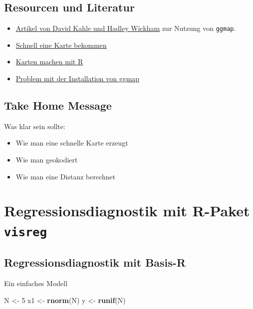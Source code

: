 \documentclass[]{article}
\newenvironment{Shaded}{\begin{snugshade}}{\end{snugshade}}
\newcommand{\KeywordTok}[1]{\textcolor[rgb]{0.13,0.29,0.53}{\textbf{{#1}}}}
\newcommand{\DecValTok}[1]{\textcolor[rgb]{0.00,0.00,0.81}{{#1}}}
\newcommand{\StringTok}[1]{\textcolor[rgb]{0.31,0.60,0.02}{{#1}}}
\newcommand{\NormalTok}[1]{{#1}}
\providecommand{\tightlist}{%
  \setlength{\itemsep}{0pt}\setlength{\parskip}{0pt}}
\begin{document}
\subsection{Resourcen und Literatur}\label{resourcen-und-literatur}

\begin{itemize}
\item
  \href{http://journal.r-project.org/archive/2013-1/kahle-wickham.pdf}{Artikel
  von David Kahle und Hadley Wickham} zur Nutzung von \texttt{ggmap}.
\item
  \href{http://rpackages.ianhowson.com/cran/ggmap/man/get_map.html}{Schnell
  eine Karte bekommen}
\item
  \href{http://www.kevjohnson.org/making-maps-in-r-part-2/}{Karten
  machen mit R}
\item
  \href{http://stackoverflow.com/questions/40642850/ggmap-error-geomrasterann-was-built-with-an-incompatible-version-of-ggproto}{Problem
  mit der Installation von ggmap}
\end{itemize}

\subsection{Take Home Message}\label{take-home-message}

Was klar sein sollte:

\begin{itemize}
\tightlist
\item
  Wie man eine schnelle Karte erzeugt
\item
  Wie man geokodiert
\item
  Wie man eine Distanz berechnet
\end{itemize}

\section{\texorpdfstring{Regressionsdiagnostik mit R-Paket
\texttt{visreg}}{Regressionsdiagnostik mit R-Paket visreg}}\label{regressionsdiagnostik-mit-r-paket-visreg}

\subsection{Regressionsdiagnostik mit
Basis-R}\label{regressionsdiagnostik-mit-basis-r}

Ein einfaches Modell

\begin{Shaded}
\begin{Highlighting}[]
\NormalTok{N <-}\StringTok{ }\DecValTok{5}
\NormalTok{x1 <-}\StringTok{ }\KeywordTok{rnorm}\NormalTok{(N)}
\NormalTok{y <-}\StringTok{ }\KeywordTok{runif}\NormalTok{(N)}
\end{Highlighting}
\end{Shaded}
\end{document}
